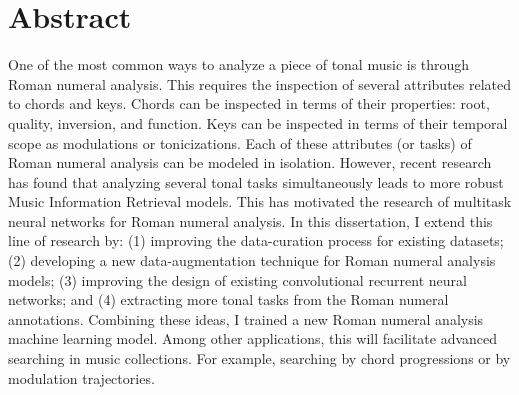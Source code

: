 \chapter*{Abstract}
\label{chap:abstract-en}

One of the most common ways to analyze a piece of tonal
music is through Roman numeral analysis. This requires the
inspection of several attributes related to chords and keys.
Chords can be inspected in terms of their properties: root,
quality, inversion, and function. Keys can be inspected in
terms of their temporal scope as modulations or
tonicizations. Each of these attributes (or tasks) of Roman
numeral analysis can be modeled in isolation. However,
recent research has found that analyzing several tonal tasks
simultaneously leads to more robust Music Information
Retrieval models. This has motivated the research of
multitask neural networks for Roman numeral analysis. In
this dissertation, I extend this line of research by: (1)
improving the data-curation process for existing datasets;
(2) developing a new data-augmentation technique for Roman
numeral analysis models; (3) improving the design of
existing convolutional recurrent neural networks; and (4)
extracting more tonal tasks from the Roman numeral
annotations. Combining these ideas, I trained a new Roman
numeral analysis machine learning model. Among other
applications, this will facilitate advanced searching in
music collections. For example, searching by chord
progressions or by modulation trajectories.
